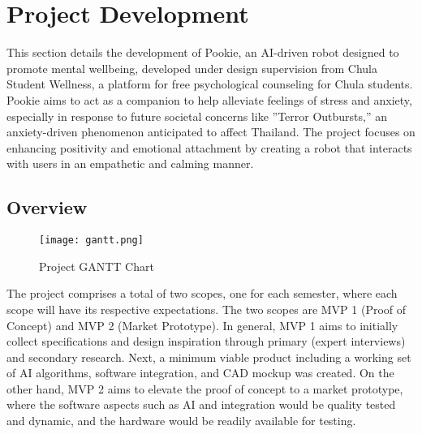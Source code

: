 \section{Project Development}

This section details the development of Pookie, an AI-driven robot designed to promote mental wellbeing, developed under design supervision from Chula Student Wellness, a platform for free psychological counseling for Chula students. Pookie aims to act as a companion to help alleviate feelings of stress and anxiety, especially in response to future societal concerns like ”Terror Outbursts,” an anxiety-driven phenomenon anticipated to affect Thailand. The project focuses on enhancing positivity and emotional attachment by creating a robot that interacts with users in an empathetic and calming manner.

\subsection{Overview}
\begin{figure}[!htb]
    \centering
    \captionsetup{justification=centering}
    \texttt{[image: gantt.png]}
    \caption{Project GANTT Chart}
    \label{fig:gantt}
\end{figure}

The project comprises a total of two scopes, one for each semester, where each scope will have its respective expectations. The two scopes are MVP 1 (Proof of Concept) and MVP 2 (Market Prototype). In general, MVP 1 aims to initially collect specifications and design inspiration through primary (expert interviews) and secondary research. Next, a minimum viable product including a working set of AI algorithms, software integration, and CAD mockup was created. On the other hand, MVP 2 aims to elevate the proof of concept to a market prototype, where the software aspects such as AI and integration would be quality tested and dynamic, and the hardware would be readily available for testing.

